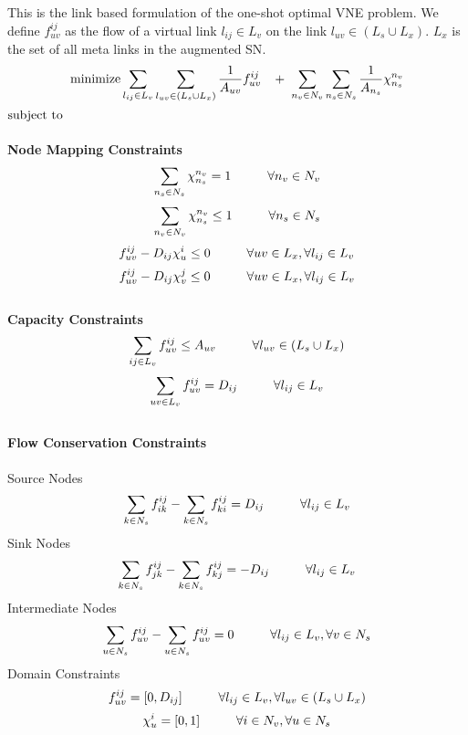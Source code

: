 \documentclass[journal]{IEEEtran}
\def\Min{{\rm minimize }}
\def\ST{{\rm subject\ to}}
\begin{document}
\appendix[ViNEOPT]
This is the link based formulation of the one-shot optimal \ac{VNE} problem. We define $f_{uv}^{ij}$ as the flow of a virtual link $l_{ij} \in L_v$ on the link $l_{uv} \in (L_s \cup L_x)$. $L_x$ is the set of all meta links in the augmented \ac{SN}.
$$\Min \sum \limits_{l_{ij} \in L_v}\sum \limits_{l_{uv} \in (L_s \cup L_x)}  \frac{1}{A_{uv}}f_{uv}^{ij}\hspace{3 mm}+\hspace{1 mm}\sum \limits_{n_v \in N_v}\sum \limits_{n_s \in N_s} \frac{1}{A_{n_s}}\chi_{n_s}^{n_v}$$
$\ST$\\\\
\textbf{Node Mapping Constraints}
$$\sum \limits_{n_s \in N_s} \chi_{n_s}^{n_v} = 1 \hspace{10 mm}\forall n_v \in N_v$$
$$\sum \limits_{n_v \in N_v} \chi_{n_s}^{n_v} \leq 1 \hspace{10 mm}\forall n_s \in N_s$$
$${f_{uv}^{ij}} - D_{ij} \chi_{u}^{i} \leq 0\hspace{10 mm}\forall uv \in L_x,\forall l_{ij} \in L_v$$
$${f_{uv}^{ij}} - D_{ij} \chi_{v}^{j} \leq 0\hspace{10 mm}\forall uv \in L_x,\forall l_{ij} \in L_v$$\\
\textbf{Capacity Constraints}
$$\sum \limits_{ij \in L_v} f_{uv}^{ij}\leq A_{uv}\hspace{10 mm}\forall l_{uv} \in (L_s \cup L_x)$$
$$\sum \limits_{uv \in L_v} f_{uv}^{ij} = D_{ij}\hspace{10 mm}\forall l_{ij} \in L_v$$\\
\textbf{Flow Conservation Constraints}\\\\
Source Nodes
$$\sum \limits_{k \in N_s} f_{ik}^{ij} - \sum \limits_{k \in N_s} f_{ki}^{ij} = D_{ij}\hspace{10 mm}\forall l_{ij} \in L_v$$
Sink Nodes
$$\sum \limits_{k \in N_s} f_{jk}^{ij} - \sum \limits_{k \in N_s} f_{kj}^{ij} = - D_{ij}\hspace{10 mm}\forall l_{ij} \in L_v$$
Intermediate Nodes
$$\sum \limits_{u \in N_s} f_{uv}^{ij} - \sum \limits_{u \in N_s} f_{uv}^{ij} =  0\hspace{10 mm}\forall l_{ij} \in L_v, \forall v \in N_s$$
Domain Constraints
$$f_{uv}^{ij} = [0, D_{ij}] \hspace{10 mm} \forall l_{ij} \in L_v, \forall l_{uv} \in (L_s \cup L_x)$$
$$\chi_{u}^{i} = [0,1] \hspace{10 mm} \forall i \in N_v, \forall u \in N_s$$
\end{document}
